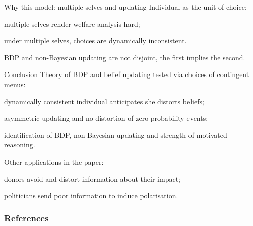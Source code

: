 \documentclass[usenames,dvipsnames,aspectratio=169,11pt, envcountsect, handout]{beamer}
\begin{document}
\begin{frame}{Why this model: multiple selves and updating}
	Individual as the unit of choice:
	\vfill

	\begin{wideitemize}
		\item multiple selves render welfare analysis hard;
		\item under multiple selves, choices are dynamically inconsistent.
	\end{wideitemize}

	\vfill

	BDP and non-Bayesian updating are not disjoint, the first implies the second.
\end{frame}


\begin{frame}{Conclusion}
	Theory of BDP and belief updating tested via choices of contingent menus:
	\vfill

	\begin{wideitemize}
		\item dynamically consistent individual anticipates she distorts beliefs;
		\item asymmetric updating and no distortion of zero probability events;
		\item identification of BDP, non-Bayesian updating and strength of motivated reasoning.
	\end{wideitemize}

	\vfill

	Other applications in the paper:

	\vfill

	\begin{wideitemize}
		\item donors avoid and distort information about their impact;
		\item politicians send poor information to induce polarisation.
	\end{wideitemize}

\end{frame}

\begin{frame}

	\frametitle{References}

	
	


\end{frame}

\appendix
\end{document}
